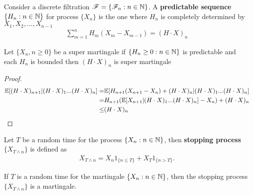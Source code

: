 \documentclass[a4paper,10pt,english]{article}
\begin{document}
Consider a discrete filtration $\mathscr{F} = \{\mathscr{F}_n: n \in \mathbb{N}\}$.  
A \textbf{predictable sequence} $\{H_n:n\in \mathbb{N}\}$ for process $\{X_n\}$ is the one where $H_n$ is completely determined by $X_1,X_2,...,X_{n-1}$
\begin{align*}
    \sum_{m=1}^{n}H_m(X_m-X_{m-1})=(H\cdot X)_n
\end{align*}
\begin{thm}
Let $\{X_n,n\geq 0\}$ be a super martingale if $\{H_n \geq 0: n \in \mathbb{N}\}$ is predictable and each $H_n$ is bounded then $(H \cdot X)_n$ is  super martingale
\end{thm}
\begin{proof}
\begin{align*}
\mathbb{E}[(H\cdot X)_{n+1}|(H\cdot X)_1 ... (H \cdot X)_n]=&\mathbb{E}[H_{n+1}(X_{n+1}-X_n)+(H\cdot X)_n|(H\cdot X)_1 ... (H \cdot X)_n]\\
=&H_{n+1}(\mathbb{E}[X_{n+1}|(H\cdot X)_1 ... (H \cdot X)_n]-X_n)+(H\cdot X)_n\\
\leq&(H\cdot X)_n
\end{align*}
\end{proof}
Let $T$ be a random time for the process $\{X_n:n\in \mathbb{N}\}$, then \textbf{stopping  process} $\{X_{T\wedge n}\}$ is defined as 
\begin{align*}
X_{T\wedge n} = X_n1_{\{n \leq T\}} + X_T1_{\{n > T\}}.
\end{align*}
\begin{prop}
If $T$ is a random time for the martingale $\{X_n:n\in \mathbb{N}\}$, then the stopping process $\{X_{T\wedge n}\}$ is a martingale.
\end{prop}
\end{document}
